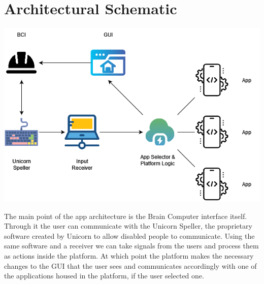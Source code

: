 \section{Architectural Schematic}\label{sect:architectural schematic}
\vspace{20pt}
\includegraphics[width = 420pt]{Diagrams/Architectural.png}

\hspace{\parindent} The main point of the app architecture is the Brain Computer interface itself. Through it the user can communicate with the Unicorn Speller, the proprietary software created by Unicorn to allow disabled people to communicate. Using the same software and a receiver we can take signals from the users and process them as actions inside the platform. At which point the platform makes the necessary changes to the GUI that the user sees and communicates accordingly with one of the applications housed in the platform, if the user selected one.